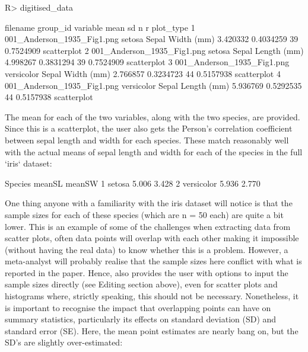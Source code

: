 \documentclass[article]{jss}
\begin{document}
\begin{CodeChunk}
\begin{CodeInput}
R> digitised_data
\end{CodeInput}
\begin{CodeOutput}
 filename   group_id         variable       mean      sd  n         r  plot_type
1 001_Anderson_1935_Fig1.png     setosa  Sepal Width (mm) 3.420332 0.4034259 39 0.7524909 scatterplot
2 001_Anderson_1935_Fig1.png     setosa Sepal Length (mm) 4.998267 0.3831294 39 0.7524909 scatterplot
3 001_Anderson_1935_Fig1.png versicolor  Sepal Width (mm) 2.766857 0.3234723 44 0.5157938 scatterplot
4 001_Anderson_1935_Fig1.png versicolor Sepal Length (mm) 5.936769 0.5292535 44 0.5157938 scatterplot
\end{CodeOutput}
\end{CodeChunk}

The mean for each of the two variables, along with the two species, are provided. Since this is a scatterplot, the user also gets the Person's correlation coefficient between sepal length and width for each species. These match reasonably well with the actual means of sepal length and width for each of the species in the full `iris` dataset:

\begin{CodeChunk}
\begin{CodeOutput}
     Species meanSL meanSW
1     setosa  5.006  3.428
2 versicolor  5.936  2.770
\end{CodeOutput}
\end{CodeChunk}

One thing anyone with a familiarity with the iris dataset will notice is that the sample sizes for each of these species (which are n = 50 each) are quite a bit lower. This is an example of some of the challenges when extracting data from scatter plots, often data points will overlap with each other making it impossible (without having the real data) to know whether this is a problem. However, a meta-analyst will probably realise that the sample sizes here conflict with what is reported in the paper. Hence,  also provides the user with  options to input the sample sizes directly (see Editing section above), even for scatter plots and histograms where, strictly speaking, this should not be necessary. Nonetheless, it is important to recognise the impact that overlapping points can have on summary statistics, particularly its effects on standard deviation (SD) and standard error (SE). Here, the mean point estimates are nearly bang on, but the SD's are slightly over-estimated:
\end{document}

